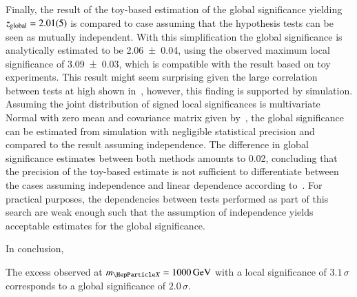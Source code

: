 Finally, the result of the toy-based estimation of the global
significance yielding $z_{\text{global}} = \num{2.01 +- 0.05}$ is
compared to case assuming that the hypothesis tests can be seen as
mutually independent. With this simplification the global significance
is analytically estimated to be \num{2.06 +- 0.04}, using the observed
maximum local significance of \num{3.09 +- 0.03}, which is compatible
with the result based on toy experiments. This result might seem
surprising given the large correlation between tests at high \mX shown
in~, however, this finding is supported by
simulation. Assuming the joint distribution of signed local
significances is multivariate Normal with zero mean and covariance
matrix given by~, the global significance can be
estimated from simulation with negligible statistical precision and
compared to the result assuming independence. The difference in global
significance estimates between both methods amounts to \num{0.02},
concluding that the precision of the toy-based estimate is not
sufficient to differentiate between the cases assuming independence
and linear dependence according to~. For practical
purposes, the dependencies between tests performed as part of this
search are weak enough such that the assumption of independence yields
acceptable estimates for the global significance.

In conclusion,

The excess observed at $\mX = \SI{1000}{\GeV}$ with a local
significance of $3.1\,\sigma$ corresponds to a global significance of
$2.0\,\sigma$.

